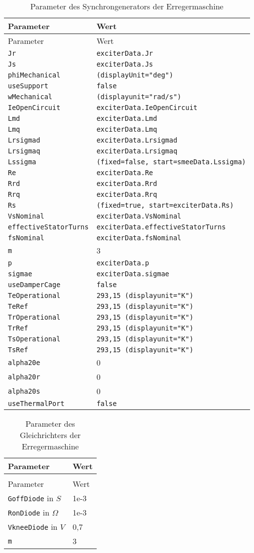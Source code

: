 \begin{longtable}[]{@{}ll@{}}
\caption{Parameter des Synchrongenerators der Erregermaschine} \label{tab:ParameterErregermaschine}
\tabularnewline
\toprule
Parameter & Wert\tabularnewline
\midrule
\endfirsthead
\toprule
Parameter & Wert\tabularnewline
\midrule
\endhead
\texttt{Jr} & \texttt{exciterData.Jr}\tabularnewline
\texttt{Js} & \texttt{exciterData.Js}\tabularnewline
\texttt{phiMechanical} & \texttt{(displayUnit="deg")}\tabularnewline
\texttt{useSupport} & \texttt{false}\tabularnewline
\texttt{wMechanical} & \texttt{(displayunit="rad/s")}\tabularnewline
\texttt{IeOpenCircuit} &
\texttt{exciterData.IeOpenCircuit}\tabularnewline
\texttt{Lmd} & \texttt{exciterData.Lmd}\tabularnewline
\texttt{Lmq} & \texttt{exciterData.Lmq}\tabularnewline
\texttt{Lrsigmad} & \texttt{exciterData.Lrsigmad}\tabularnewline
\texttt{Lrsigmaq} & \texttt{exciterData.Lrsigmaq}\tabularnewline
\texttt{Lssigma} &
\texttt{(fixed=false,\ start=smeeData.Lssigma)}\tabularnewline
\texttt{Re} & \texttt{exciterData.Re}\tabularnewline
\texttt{Rrd} & \texttt{exciterData.Rrd}\tabularnewline
\texttt{Rrq} & \texttt{exciterData.Rrq}\tabularnewline
\texttt{Rs} &
\texttt{(fixed=true,\ start=exciterData.Rs)}\tabularnewline
\texttt{VsNominal} & \texttt{exciterData.VsNominal}\tabularnewline
\texttt{effectiveStatorTurns} &
\texttt{exciterData.effectiveStatorTurns}\tabularnewline
\texttt{fsNominal} & \texttt{exciterData.fsNominal}\tabularnewline
\texttt{m} & 3\tabularnewline
\texttt{p} & \texttt{exciterData.p}\tabularnewline
\texttt{sigmae} & \texttt{exciterData.sigmae}\tabularnewline
\texttt{useDamperCage} & \texttt{false}\tabularnewline
\texttt{TeOperational} &
\texttt{293,15\ (displayunit="K")}\tabularnewline
\texttt{TeRef} & \texttt{293,15\ (displayunit="K")}\tabularnewline
\texttt{TrOperational} &
\texttt{293,15\ (displayunit="K")}\tabularnewline
\texttt{TrRef} & \texttt{293,15\ (displayunit="K")}\tabularnewline
\texttt{TsOperational} &
\texttt{293,15\ (displayunit="K")}\tabularnewline
\texttt{TsRef} & \texttt{293,15\ (displayunit="K")}\tabularnewline
\texttt{alpha20e} & 0\tabularnewline
\texttt{alpha20r} & 0\tabularnewline
\texttt{alpha20s} & 0\tabularnewline
\texttt{useThermalPort} & \texttt{false}\tabularnewline
\bottomrule
\end{longtable}

\begin{longtable}[]{@{}ll@{}}
\caption{Parameter des Gleichrichters der Erregermaschine}
\label{tab:GleichrichterErregermaschine}
\tabularnewline
\toprule
Parameter & Wert\tabularnewline
\midrule
\endfirsthead
\caption{Parameter des Gleichrichters der Erregermaschine}\tabularnewline
\toprule
Parameter & Wert\tabularnewline
\midrule
\endhead
\texttt{GoffDiode} in $\unit{S}$     & 1e-3\tabularnewline
\texttt{RonDiode} in $\unit{\Omega}$ & 1e-3\tabularnewline
\texttt{VkneeDiode} in $\unit{V}$    & 0,7\tabularnewline
\texttt{m} & 3\tabularnewline
\bottomrule
\end{longtable}

